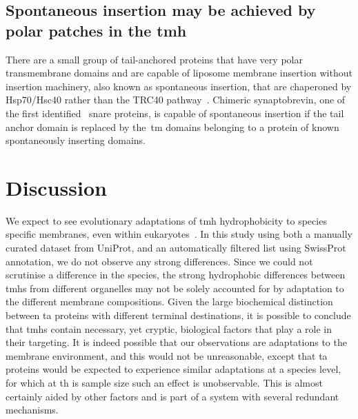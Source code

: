 
\subsection{Spontaneous insertion may be achieved by polar patches in the \gls{tmh}}

There are a small group of tail-anchored proteins that have very polar transmembrane domains and are capable of liposome membrane insertion without insertion machinery, also known as spontaneous insertion, that are chaperoned by Hsp70/Hsc40 rather than the TRC40 pathway~\cite{Rabu2008, Rabu2009, Colombo2009}.
Chimeric synaptobrevin, one of the first identified~ \gls{snare} proteins, is capable of spontaneous insertion if the tail anchor domain is replaced by the~\gls{tm} domains belonging to a protein of known spontaneously inserting domains.

\section{Discussion}

We expect to see evolutionary adaptations of \gls{tmh} hydrophobicity to species specific membranes, even within eukaryotes~\cite{Baker2017, Sharpe2010}.
In this study using both a manually curated dataset from UniProt, and an automatically filtered list using SwissProt annotation, we do not observe any strong differences.
Since we could not scrutinise a difference in the species, the strong hydrophobic differences between \gls{tmh}s from different organelles may not be solely accounted for by adaptation to the different membrane compositions.
Given the large biochemical distinction between \gls{ta} proteins with different terminal destinations, it is possible to conclude that \gls{tmh}s contain necessary, yet cryptic, biological factors that play a role in their targeting.
It is indeed possible that our observations are adaptations to the membrane environment, and this would not be unreasonable, except that \gls{ta} proteins would be expected to experience similar adaptations at a species level, for which at th  is sample size such an effect is unobservable.
This is almost certainly aided by other factors and is part of a system with several redundant mechanisms.

